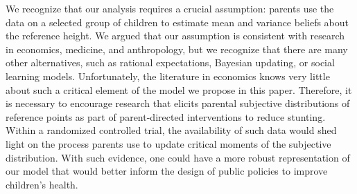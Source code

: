 We recognize that our analysis requires a crucial assumption: parents use the data on a selected group of children to estimate mean and variance beliefs about the reference height. We argued that our assumption is consistent with research in economics, medicine, and anthropology, but we recognize that there are many other alternatives, such as rational expectations, Bayesian updating, or social learning models. Unfortunately, the literature in economics knows very little about such a critical element of the model we propose in this paper. Therefore, it is necessary to encourage research that elicits parental subjective distributions of reference points as part of parent-directed interventions to reduce stunting. Within a randomized controlled trial, the availability of such data would shed light on the process parents use to update critical moments of the subjective distribution. With such evidence, one could have a more robust representation of our model that would better inform the design of public policies to improve children’s health.